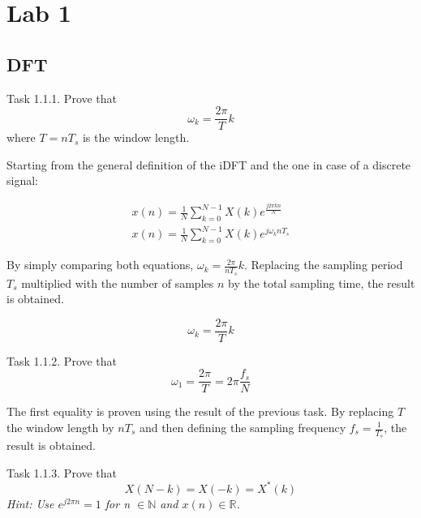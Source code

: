 \setcounter{secnumdepth}{1}

\chapter{Lab 1}

\section{DFT}

\begin{Task}{Task 1.1.1.}
    Prove that
    \begin{equation*}
        \omega_k = \frac{2\pi}{T} k
    \end{equation*}
    where $T = nT_s$ is the window length.
\end{Task}

Starting from the general definition of the iDFT and the one in case of a discrete signal:

\begin{align*}
    x(n) = \frac{1}{N} \sum_{k=0}^{N-1} X(k) e^{\frac{j 2 \pi k n}{N}}\\
    x(n) = \frac{1}{N} \sum_{k=0}^{N-1} X(k) e^{j \omega_k n T_s}
\end{align*}

By simply comparing both equations, $\omega_k = \frac{2\pi}{n T_s} k$. Replacing the sampling period $T_s$ multiplied with the number of samples $n$ by the total sampling time, the result is obtained.

\begin{equation*}
    \omega_k = \frac{2\pi}{T} k
\end{equation*}

\begin{Task}{Task 1.1.2.}
    Prove that
    \begin{equation*}
        \omega_1 = \frac{2\pi}{T} = 2\pi \frac{f_s}{N}
    \end{equation*}
\end{Task}

The first equality is proven using the result of the previous task. By replacing $T$ the window length by $nT_s$ and then defining the sampling frequency $f_s = \frac{1}{T_s}$, the result is obtained.

\begin{Task}{Task 1.1.3.}
    Prove that
    \begin{equation*}
        X(N-k) = X(-k) = X^*(k)
    \end{equation*}
    \textit{Hint: Use $e^{j2\pi n} = 1$ for n $\in \mathbb{N}$ and $x(n) \in \mathbb{R}$.}
\end{Task}

